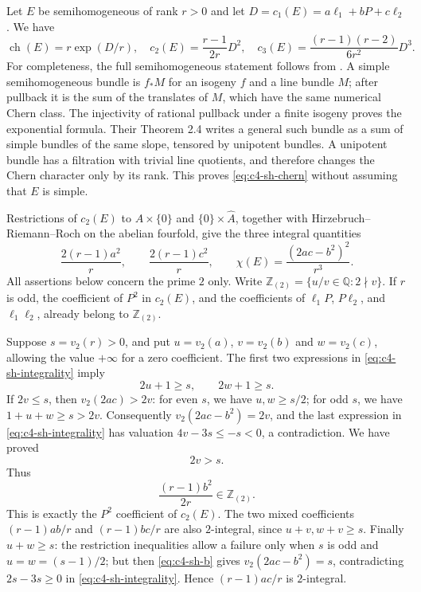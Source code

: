 Let $E$ be semihomogeneous of rank $r>0$ and let
$D=c_1(E)=a\ell_1+bP+c\ell_2$. We have
\begin{equation}\label{eq:c4-sh-chern}
 \operatorname{ch}(E)=r\exp(D/r),\quad
 c_2(E)=\frac{r-1}{2r}D^2,\quad
 c_3(E)=\frac{(r-1)(r-2)}{6r^2}D^3.
\end{equation}
For completeness, the full semihomogeneous statement follows from
\citet[Theorems 2.4 and 2.6, p.~6, and Lemma 2.9, pp.~6--7]
{frGrossKaurUlirschWerner2026}. A simple semihomogeneous bundle is
$f_*M$ for an isogeny $f$ and a line bundle $M$; after pullback it is the
sum of the translates of $M$, which have the same numerical Chern class.
The injectivity of rational pullback under a finite isogeny proves the
exponential formula. Their Theorem 2.4 writes a general such bundle as a
sum of simple bundles of the same slope, tensored by unipotent bundles.
A unipotent bundle has a filtration with trivial line quotients, and
therefore changes the Chern character only by its rank. This proves
\eqref{eq:c4-sh-chern} without assuming that $E$ is simple.

Restrictions of $c_2(E)$ to $A\times\{0\}$ and
$\{0\}\times\widehat A$, together with Hirzebruch--Riemann--Roch on
the abelian fourfold, give the three integral quantities
\begin{equation}\label{eq:c4-sh-integrality}
 \frac{2(r-1)a^2}{r},\qquad
 \frac{2(r-1)c^2}{r},\qquad
 \chi(E)=\frac{(2ac-b^2)^2}{r^3}.
\end{equation}
All assertions below concern the prime $2$ only. Write
$\mathbb Z_{(2)}=\{u/v\in\mathbb Q:2\nmid v\}$.
If $r$ is odd, the coefficient of $P^2$ in $c_2(E)$, and the
coefficients of $\ell_1P$, $P\ell_2$, and $\ell_1\ell_2$, already
belong to $\mathbb Z_{(2)}$.

Suppose $s=v_2(r)>0$, and put $u=v_2(a)$, $v=v_2(b)$ and
$w=v_2(c)$, allowing the value $+\infty$ for a zero coefficient.
The first two expressions in \eqref{eq:c4-sh-integrality} imply
\[
                          2u+1\ge s,\qquad 2w+1\ge s.
\]
If $2v\le s$, then $v_2(2ac)>2v$: for even $s$, we have
$u,w\ge s/2$; for odd $s$, we have
$1+u+w\ge s>2v$. Consequently
$v_2(2ac-b^2)=2v$, and the last expression in
\eqref{eq:c4-sh-integrality} has valuation
$4v-3s\le-s<0$, a contradiction. We have proved
\begin{equation}\label{eq:c4-sh-b}
                                2v>s.
\end{equation}
Thus
\[
             \frac{(r-1)b^2}{2r}\in\mathbb Z_{(2)}.
\]
This is exactly the $P^2$ coefficient of $c_2(E)$.
The two mixed coefficients $(r-1)ab/r$ and $(r-1)bc/r$ are also
$2$-integral, since $u+v,w+v\ge s$. Finally $u+w\ge s$:
the restriction inequalities allow a failure only when $s$ is odd and
$u=w=(s-1)/2$; but then \eqref{eq:c4-sh-b} gives
$v_2(2ac-b^2)=s$, contradicting $2s-3s\ge0$ in
\eqref{eq:c4-sh-integrality}. Hence $(r-1)ac/r$ is $2$-integral.

